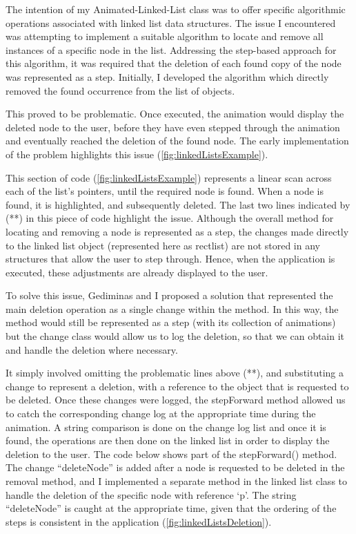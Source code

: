 \documentclass{l3proj}
\begin{document}
The intention of my Animated-Linked-List class was to offer specific algorithmic operations associated with linked list data structures. The issue I encountered was attempting to implement a suitable algorithm to locate and remove all instances of a specific node in the list. Addressing the step-based approach for this algorithm, it was required that the deletion of each found copy of the node was represented as a step. Initially, I developed the algorithm which directly removed the found occurrence from the list of objects.



This proved to be problematic. Once executed, the animation would display the deleted node to the user, before they have even stepped through the animation and eventually reached the deletion of the found node. The early implementation of the problem highlights this issue (\ref{fig:linkedListsExample}).

This section of code (\ref{fig:linkedListsExample}) represents a linear scan across each of the list’s pointers, until the required node is found. When a node is found, it is highlighted, and subsequently deleted. The last two lines indicated by (**) in this piece of code highlight the issue. Although the overall method for locating and removing a node is represented as a step, the changes made directly to the linked list object (represented here as rectlist) are not stored in any structures that allow the user to step through. Hence, when the application is executed, these adjustments are already displayed to the user. 

To solve this issue, Gediminas and I proposed a solution that represented the main deletion operation as a single change within the method. In this way, the method would still be represented as a step (with its collection of animations) but the change class would allow us to log the deletion, so that we can obtain it and handle the deletion where necessary.



It simply involved omitting the problematic lines above (**), and substituting a change to represent a deletion, with a reference to the object that is requested to be deleted. Once these changes were logged, the stepForward method allowed us to catch the corresponding change log at the appropriate time during the animation. A string comparison is done on the change log list and once it is found, the operations are then done on the linked list in order to display the deletion to the user. The code below shows part of the stepForward() method. The change “deleteNode” is added after a node is requested to be deleted in the removal method, and I implemented a separate method in the linked list class to handle the deletion of the specific node with reference ‘p’. The string “deleteNode” is caught at the appropriate time, given that the ordering of the steps is consistent in the application (\ref{fig:linkedListsDeletion}).
\end{document}
